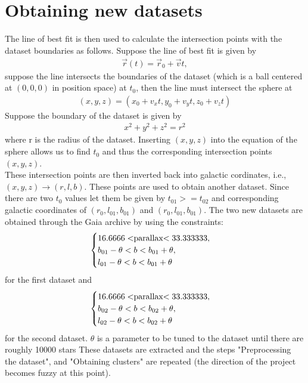 \documentclass[12pt]{amsart}
\begin{document}
{\section*{Obtaining new datasets}
\indent The line of best fit is then used to calculate the intersection points with the dataset boundaries as follows. Suppose the line of best fit is given by\\
\begin{align}
	\vec{r}(t)=\vec{r}_0 + \vec{v}t,
\end{align}
suppose the line intersects the boundaries of the dataset (which is a ball centered at $(0,0,0)$ in position space) at $t_0$, then the line must intersect the sphere at 
\begin{align}
(x,y,z)=(x_0+v_xt,y_0+v_yt,z_0+v_zt)
\end{align}
Suppose the boundary of the dataset is given by 
\begin{align}
x^2+y^2+z^2=r^2
\end{align}
 where r is the radius of the dataset. Inserting $(x,y,z)$ into the equation of the sphere allows us to find $t_0$ and thus the corresponding intersection points $(x,y,z)$.\\
\indent These intersection points are then inverted back into galactic cordinates, i.e., $(x,y,z) \rightarrow (r,l,b)$. These points are used to obtain another dataset. Since there are two $t_0$ values let them be given by $t_{01}>=t_{02}$ and corresponding galactic coordinates of $(r_0,l_{01},b_{01})$ and $(r_0,l_{01},b_{01})$. The two new datasets are obtained through the Gaia archive by using the constraints:
\begin{align}
\begin{cases}
	16.6666<$parallax$<33.333333,\\
	b_{01}-\theta<b<b_{01}+\theta,\\
	l_{01}-\theta<b<b_{01}+\theta
\end{cases}
\end{align}
 for the first dataset and\\
 \begin{align}
 \begin{cases}
	16.6666<$parallax$<33.333333,\\
	b_{02}-\theta<b<b_{02}+\theta,\\
	l_{02}-\theta<b<b_{02}+\theta
\end{cases}
\end{align} 
for the second dataset. $\theta$ is a parameter to be tuned to the dataset until there are roughly 10000 stars These datasets are extracted and the steps "Preprocessing the dataset", and "Obtaining clusters" are repeated (the direction of the project becomes fuzzy at this point).\\

}
\end{document}
